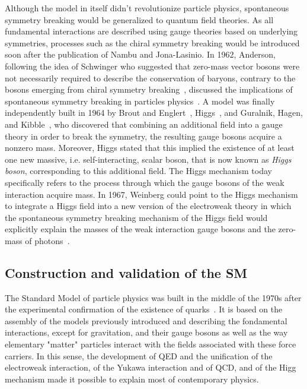 	Although the model in itself didn't revolutionize particle physics, spontaneous symmetry breaking would be generalized to quantum field theories. As all fundamental interactions are described using gauge theories based on underlying symmetries, processes such as the chiral symmetry breaking would be introduced soon after the publication of Nambu and Jona-Lasinio. In 1962, Anderson, following the idea of Schwinger who suggested that zero-mass vector bosons were not necessarily required to describe the conservation of baryons, contrary to the bosons emerging from chiral symmetry breaking~\cite{SCHWINGER1962}, discussed the implications of spontaneous symmetry breaking in particles physics~\cite{ANDERSON1963}. A model was finally independently built in 1964 by Brout and Englert~\cite{ENGLERT1964}, Higgs~\cite{HIGGS1964}, and Guralnik, Hagen, and Kibble~\cite{GURALNIK1964}, who discovered that combining an additional field into a gauge theory in order to break the symmetry, the resulting gauge bosons acquire a nonzero mass. Moreover, Higgs stated that this implied the existence of at least one new massive, i.e. self-interacting, scalar boson, that is now known as \textit{Higgs boson}, corresponding to this additional field. The Higgs mechanism today specifically refers to the process through which the gauge bosons of the weak interaction acquire mass. In 1967, Weinberg could point to the Higgs mechanism to integrate a Higgs field into a new version of the electroweak theory in which the spontaneous symmetry breaking mechanism of the Higgs field would explicitly explain the masses of the weak interaction gauge bosons and the zero-mass of photons~\cite{WEINBERG1967}.
	
	\subsection{Construction and validation of the \acl{SM}}
	\label{chapt2:ssec:model}
	
	The Standard Model of particle physics was built in the middle of the 1970s after the experimental confirmation of the existence of quarks~\cite{SMWIKI}. It is based on the assembly of the models previously introduced and describing the fondamental interactions, except for gravitation, and their gauge bosons as well as the way elementary "matter" particles interact with the fields associated with these force carriers. In this sense, the development of QED and the unification of the electroweak interaction, of the Yukawa interaction and of QCD, and of the Higg mechanism made it possible to explain most of contemporary physics.
	
